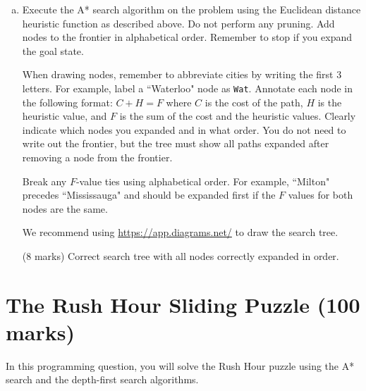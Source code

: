 \documentclass[12pt]{article}
\begin{document}
\begin{enumerate}[(a)]
\begin{markscheme}
(6 marks)

\begin{itemize}
\item
(4 marks) Correct proof
\item
(2 marks) The proof is clear, succinct, and easy to understand
\end{itemize}

\end{markscheme}


\item
\label{execute_a_star}
Execute the A* search algorithm on the problem using the Euclidean distance heuristic function as described above. Do not perform any pruning. Add nodes to the frontier in alphabetical order. Remember to stop if you expand the goal state.

When drawing nodes, remember to abbreviate cities by writing the first 3 letters. For example, label a ``Waterloo" node as \texttt{Wat}. Annotate each node in the following format: $C + H = F$ where $C$ is the cost of the path, $H$ is the heuristic value, and $F$ is the sum of the cost and the heuristic values. Clearly indicate which nodes you expanded and in what order. You do not need to write out the frontier, but the tree must show all paths expanded after removing a node from the frontier.

Break any $F$-value ties using alphabetical order. For example, ``Milton" precedes ``Mississauga" and should be expanded first if the $F$ values for both nodes are the same.

We recommend using \url{https://app.diagrams.net/} to draw the search tree.

\begin{markscheme}
(8 marks) Correct search tree with all nodes correctly expanded in order.
\end{markscheme}


\end{enumerate}



\newpage
\section{The Rush Hour Sliding Puzzle (100 marks)}

In this programming question, you will solve the Rush Hour puzzle using the A* search and the depth-first search algorithms.
\end{document}
